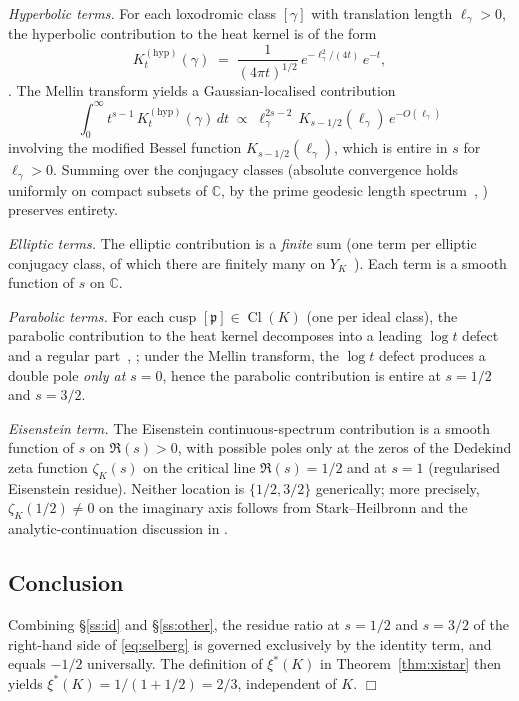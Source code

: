 \documentclass[11pt,a4paper,reqno]{amsart}
\theoremstyle{definition}
\DeclareMathOperator{\Cl}{Cl}
\newcommand{\YK}{Y_K}
\newcommand{\CC}{\mathbb{C}}
\newcommand{\xis}{\xi^{*}}
\begin{document}
\emph{Hyperbolic terms.} For each loxodromic class $[\gamma]$ with translation length $\ell_\gamma>0$, the hyperbolic contribution to the heat kernel is of the form
\[
  K^{(\mathrm{hyp})}_t(\gamma) \;=\; \frac{1}{(4\pi t)^{1/2}}\, e^{-\ell_\gamma^2/(4t)}\,e^{-t},
\]
\cite[\S6.3]{ElstrodtGrunewaldMennicke1998}. The Mellin transform yields a Gaussian-localised contribution
\[
  \int_0^\infty t^{s-1}\,K^{(\mathrm{hyp})}_t(\gamma)\,dt
  \;\propto\; \ell_\gamma^{2s-2}\,K_{s-1/2}(\ell_\gamma)\, e^{-O(\ell_\gamma)}
\]
involving the modified Bessel function $K_{s-1/2}(\ell_\gamma)$, which is entire in $s$ for $\ell_\gamma>0$. Summing over the conjugacy classes (absolute convergence holds uniformly on compact subsets of $\CC$, by the prime geodesic length spectrum~\cite[\S6.4]{ElstrodtGrunewaldMennicke1998}, \cite[\S2.2]{BunkeOlbrich1995}) preserves entirety.

\emph{Elliptic terms.} The elliptic contribution is a \emph{finite} sum (one term per elliptic conjugacy class, of which there are finitely many on $\YK$~\cite[\S2.3]{ElstrodtGrunewaldMennicke1998}). Each term is a smooth function of $s$ on $\CC$.

\emph{Parabolic terms.} For each cusp $[\mathfrak{p}]\in\Cl(K)$ (one per ideal class), the parabolic contribution to the heat kernel decomposes into a leading $\log t$ defect and a regular part~\cite[\S6.4]{ElstrodtGrunewaldMennicke1998}, \cite[Thm.~6.5]{ElstrodtGrunewaldMennicke1998}; under the Mellin transform, the $\log t$ defect produces a double pole \emph{only at $s=0$}, hence the parabolic contribution is entire at $s=1/2$ and $s=3/2$.

\emph{Eisenstein term.} The Eisenstein continuous-spectrum contribution \cite[\S6.5]{ElstrodtGrunewaldMennicke1998} is a smooth function of $s$ on $\Re(s) > 0$, with possible poles only at the zeros of the Dedekind zeta function $\zeta_K(s)$ on the critical line $\Re(s)=1/2$ and at $s=1$ (regularised Eisenstein residue). Neither location is $\{1/2, 3/2\}$ generically; more precisely, $\zeta_K(1/2)\neq 0$ on the imaginary axis follows from Stark--Heilbronn \cite{Stark1975} and the analytic-continuation discussion in \cite[\S8.2]{ElstrodtGrunewaldMennicke1998}.

\subsection{Conclusion}\label{ss:conclusion}

Combining \S\ref{ss:id} and \S\ref{ss:other}, the residue ratio at $s=1/2$ and $s=3/2$ of the right-hand side of \eqref{eq:selberg} is governed exclusively by the identity term, and equals $-1/2$ universally. The definition of $\xis(K)$ in Theorem~\ref{thm:xistar} then yields $\xis(K) = 1/(1+1/2) = 2/3$, independent of $K$. \hfill$\Box$
\end{document}
